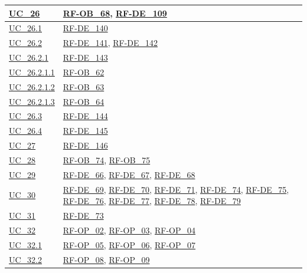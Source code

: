 \begin{longtable}{|
        >{\raggedright\arraybackslash}p{} |
        >{\raggedright\arraybackslash}p{} |
    }
    \hline
    \hyperref[uc_26]{UC\_26} & \hyperlink{rf-ob_68}{RF-OB\_68}, \hyperlink{rf-de_109}{RF-DE\_109} \\
    \hline
    \hyperref[uc_26.1]{UC\_26.1} & \hyperlink{rf-de_140}{RF-DE\_140} \\
    \hline
    \hyperref[uc_26.2]{UC\_26.2} & \hyperlink{rf-de_141}{RF-DE\_141}, \hyperlink{rf-de_142}{RF-DE\_142} \\
    \hline
    \hyperref[uc_26.2.1]{UC\_26.2.1} & \hyperlink{rf-de_143}{RF-DE\_143} \\
    \hline
    \hyperref[uc_26.2.1.1]{UC\_26.2.1.1} & \hyperlink{rf-ob_62}{RF-OB\_62} \\
    \hline
    \hyperref[uc_26.2.1.2]{UC\_26.2.1.2} & \hyperlink{rf-ob_63}{RF-OB\_63} \\
    \hline
    \hyperref[uc_26.2.1.3]{UC\_26.2.1.3} & \hyperlink{rf-ob_64}{RF-OB\_64} \\
    \hline
    \hyperref[uc_26.3]{UC\_26.3} & \hyperlink{rf-de_144}{RF-DE\_144} \\
    \hline
    \hyperref[uc_26.4]{UC\_26.4} & \hyperlink{rf-de_145}{RF-DE\_145} \\
    \hline
    \hyperref[uc_27]{UC\_27} & \hyperlink{rf-de_146}{RF-DE\_146} \\
    \hline
    \hyperref[uc_28]{UC\_28} & \hyperlink{rf-ob_74}{RF-OB\_74}, \hyperlink{rf-ob_75}{RF-OB\_75} \\
    \hline
    \hyperref[uc_29]{UC\_29} & \hyperlink{rf-de_66}{RF-DE\_66}, \hyperlink{rf-de_67}{RF-DE\_67}, \hyperlink{rf-de_68}{RF-DE\_68} \\
    \hline
    \hyperref[uc_30]{UC\_30} & \hyperlink{rf-de_69}{RF-DE\_69}, \hyperlink{rf-de_70}{RF-DE\_70}, \hyperlink{rf-de_71}{RF-DE\_71}, \hyperlink{rf-de_74}{RF-DE\_74}, \hyperlink{rf-de_75}{RF-DE\_75}, \hyperlink{rf-de_76}{RF-DE\_76}, \hyperlink{rf-de_77}{RF-DE\_77}, \hyperlink{rf-de_78}{RF-DE\_78}, \hyperlink{rf-de_79}{RF-DE\_79} \\
    \hline
    \hyperref[uc_31]{UC\_31} & \hyperlink{rf-de_73}{RF-DE\_73} \\
    \hline
    \hyperref[uc_32]{UC\_32} & \hyperlink{rf-op_2}{RF-OP\_02}, \hyperlink{rf-op_3}{RF-OP\_03}, \hyperlink{rf-op_4}{RF-OP\_04} \\
    \hline
    \hyperref[uc_32.1]{UC\_32.1} & \hyperlink{rf-op_5}{RF-OP\_05}, \hyperlink{rf-op_6}{RF-OP\_06}, \hyperlink{rf-op_7}{RF-OP\_07} \\
    \hline
    \hyperref[uc_32.2]{UC\_32.2} & \hyperlink{rf-op_8}{RF-OP\_08}, \hyperlink{rf-op_9}{RF-OP\_09} \\

\end{longtable}

